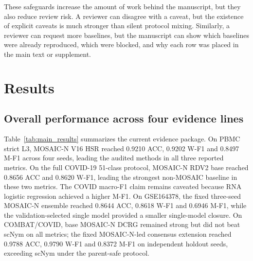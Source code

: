 \documentclass[unnumsec,webpdf,contemporary,large,numbered]{oup-authoring-template}
\begin{document}
These safeguards increase the amount of work behind the manuscript, but they also reduce review risk. A reviewer can disagree with a caveat, but the existence of explicit caveats is much stronger than silent protocol mixing. Similarly, a reviewer can request more baselines, but the manuscript can show which baselines were already reproduced, which were blocked, and why each row was placed in the main text or supplement.

\section{Results}

\subsection{Overall performance across four evidence lines}

Table~\ref{tab:main_results} summarizes the current evidence package. On PBMC strict L3, MOSAIC-N V16 HSR reached 0.9210 ACC, 0.9202 W-F1 and 0.8497 M-F1 across four seeds, leading the audited methods in all three reported metrics. On the full COVID-19 51-class protocol, MOSAIC-N RDV2 base reached 0.8656 ACC and 0.8620 W-F1, leading the strongest non-MOSAIC baseline in these two metrics. The COVID macro-F1 claim remains caveated because RNA logistic regression achieved a higher M-F1. On GSE164378, the fixed three-seed MOSAIC-N ensemble reached 0.8644 ACC, 0.8618 W-F1 and 0.6946 M-F1, while the validation-selected single model provided a smaller single-model closure. On COMBAT/COVID, base MOSAIC-N DCRG remained strong but did not beat scNym on all metrics; the fixed MOSAIC-N-led consensus extension reached 0.9788 ACC, 0.9790 W-F1 and 0.8372 M-F1 on independent holdout seeds, exceeding scNym under the parent-safe protocol.
\end{document}
